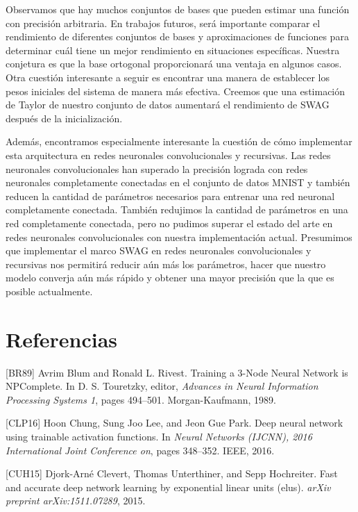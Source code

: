 \documentclass[10pt]{article}
\begin{document}
Observamos que hay muchos conjuntos de bases que pueden estimar una función con precisión arbitraria. En trabajos futuros, será importante comparar el rendimiento de diferentes conjuntos de bases y aproximaciones de funciones para determinar cuál tiene un mejor rendimiento en situaciones específicas.
Nuestra conjetura es que la base ortogonal proporcionará una ventaja en algunos casos. Otra cuestión interesante a seguir es encontrar una manera de establecer los pesos iniciales del sistema de manera más
efectiva. Creemos que una estimación de Taylor de nuestro conjunto de datos aumentará el rendimiento de SWAG después de la inicialización.

Además, encontramos especialmente interesante la cuestión de cómo implementar esta arquitectura en redes neuronales convolucionales y recursivas. Las redes neuronales convolucionales han superado la precisión lograda con redes neuronales completamente conectadas en el conjunto de
datos MNIST y también reducen la cantidad de parámetros necesarios para entrenar una red neuronal completamente conectada. También redujimos la cantidad de parámetros en una red completamente conectada, pero no pudimos superar el estado del arte en redes neuronales convolucionales con nuestra implementación actual. Presumimos que implementar el marco SWAG en redes neuronales convolucionales y recursivas nos permitirá reducir aún más los parámetros, hacer que nuestro modelo converja aún más rápido y obtener una mayor precisión que la que es posible actualmente.

\section{Referencias}

[BR89] Avrim Blum and Ronald L. Rivest. Training a 3-Node Neural Network is NPComplete. In D. S. Touretzky, editor, \emph{Advances in Neural Information Processing Systems 1},  pages 494–501. Morgan-Kaufmann, 1989.
\newline

[CLP16] Hoon Chung, Sung Joo Lee, and Jeon Gue Park. Deep neural network using trainable activation functions. In \emph{Neural Networks (IJCNN), 2016 International Joint Conference on}, pages 348–352. IEEE, 2016.
\newline

[CUH15] Djork-Arné Clevert, Thomas Unterthiner, and Sepp Hochreiter. Fast and accurate deep network learning by exponential linear units (elus). \emph{arXiv preprint
arXiv:1511.07289}, 2015.
\newline
\end{document}
